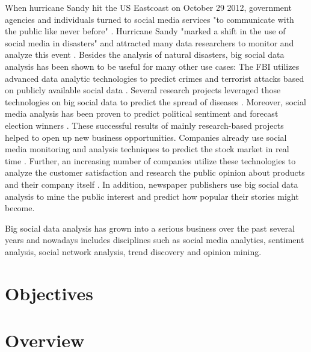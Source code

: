 When hurricane Sandy hit the US Eastcoast on October 29 2012, government agencies and individuals turned to social media services "to communicate with the public like never before" \cite{emergencymgmt2013sandy}. Hurricane Sandy "marked a shift in the use of social media in disasters" \cite[6]{security13sandy} and attracted many data researchers to monitor and analyze this event \cite{kumar2011tweettracker,carageamapping2014sandy}. Besides the analysis of natural disasters, big social data analysis has been shown to be useful for many other use cases: The FBI utilizes advanced data analytic technologies to predict crimes and terrorist attacks based on publicly available social data \cite{wang2012automatic}. Several research projects leveraged those technologies on big social data to predict the spread of diseases \cite{Google09detection,gft2014}. Moreover, social media analysis has been proven to predict political sentiment and forecast election winners \cite{bermingham2011using}. These successful results of mainly research-based projects helped to open up new business opportunities. Companies already use social media monitoring and analysis techniques to predict the stock market in real time \cite{bollen2011twitter,alcorn2013stockmarket}. Further, an increasing number of companies utilize these technologies to analyze the customer satisfaction and research the public opinion about products and their company itself \cite{journals/expert/CambriaSXH13}. In addition, newspaper publishers use big social data analysis to mine the public interest and predict how popular their stories might become.

Big social data analysis has grown into a serious business over the past several years and nowadays includes disciplines such as social media analytics, sentiment analysis, social network analysis, trend discovery and opinion mining.


\section{Objectives}
\label{sec:objectives}


\section{Overview}
\label{sec:overview}